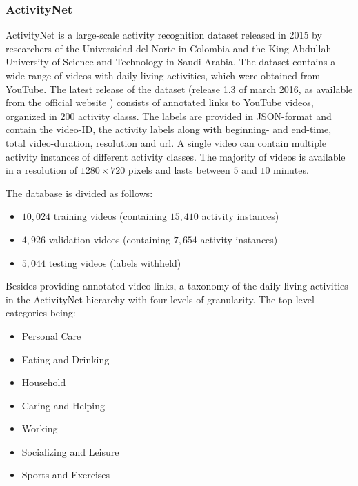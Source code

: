 \subsubsection{ActivityNet}
\cite{caba_heilbron_activitynet:_2015}
ActivityNet is a large-scale activity recognition dataset released in 2015 by researchers of the Universidad del Norte in Colombia and the King Abdullah University of Science and Technology in Saudi Arabia.
The dataset contains a wide range of videos with daily living activities, which were obtained from YouTube.
The latest release of the dataset (release 1.3 of march 2016, as available from the official website \cite{_activity_????}) consists of annotated links to YouTube videos, organized in $200$ activity classs.
The labels are provided in JSON-format and contain the video-ID, the activity labels along with beginning- and end-time, total video-duration, resolution and url.
A single video can contain multiple activity instances of different activity classes.
The majority of videos is available in a resolution of $1280 \times 720$ pixels and lasts between $5$ and $10$ minutes.

The database is divided as follows:
\begin{itemize}
    \item $10,024$ training videos (containing $15,410$ activity instances) 
    \item $4,926$ validation videos (containing $7,654$ activity instances)
    \item $5,044$ testing videos (labels withheld) 
\end{itemize}

Besides providing annotated video-links, a taxonomy of the daily living activities in the ActivityNet hierarchy with four levels of granularity.
The top-level categories being:
\begin{itemize}
    \item Personal Care
    \item Eating and Drinking
    \item Household
    \item Caring and Helping
    \item Working
    \item Socializing and Leisure
    \item Sports and Exercises
\end{itemize}

